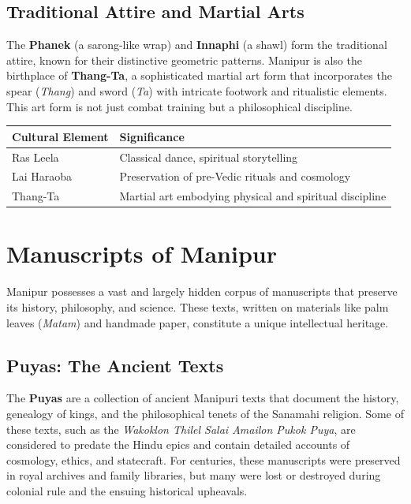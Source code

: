 \documentclass{article}
\begin{document}
\subsection{Traditional Attire and Martial Arts}
The \textbf{Phanek} (a sarong-like wrap) and \textbf{Innaphi} (a shawl) form the traditional attire, known for their distinctive geometric patterns. Manipur is also the birthplace of \textbf{Thang-Ta}, a sophisticated martial art form that incorporates the spear (\textit{Thang}) and sword (\textit{Ta}) with intricate footwork and ritualistic elements. This art form is not just combat training but a philosophical discipline.

\begin{center}
    \begin{tabular}{|P{4cm}|P{8cm}|}
        \hline
        \textbf{Cultural Element} & \textbf{Significance} \\
        \hline
        Ras Leela & Classical dance, spiritual storytelling \\
        \hline
        Lai Haraoba & Preservation of pre-Vedic rituals and cosmology \\
        \hline
        Thang-Ta & Martial art embodying physical and spiritual discipline \\
        \hline
    \end{tabular}
\end{center}

\section{Manuscripts of Manipur}
Manipur possesses a vast and largely hidden corpus of manuscripts that preserve its history, philosophy, and science. These texts, written on materials like palm leaves (\textit{Matam}) and handmade paper, constitute a unique intellectual heritage.

\subsection{Puyas: The Ancient Texts}
The \textbf{Puyas} are a collection of ancient Manipuri texts that document the history, genealogy of kings, and the philosophical tenets of the Sanamahi religion. Some of these texts, such as the \textit{Wakoklon Thilel Salai Amailon Pukok Puya}, are considered to predate the Hindu epics and contain detailed accounts of cosmology, ethics, and statecraft. For centuries, these manuscripts were preserved in royal archives and family libraries, but many were lost or destroyed during colonial rule and the ensuing historical upheavals.
\end{document}
